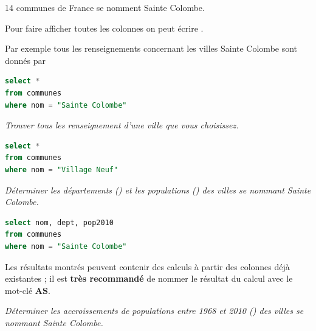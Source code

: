 14 communes de France se nomment Sainte Colombe.

\medskip

Pour faire afficher toutes les colonnes on peut écrire .

Par exemple tous les renseignements concernant les villes Sainte Colombe sont donnés par
\begin{lstlisting}[language=SQL]
select *
from communes  
where nom = "Sainte Colombe"
\end{lstlisting}
\begin{Exercise}
\it Trouver tous les renseignement d'une ville que vous choisissez.
\end{Exercise}
\begin{Answer}
\begin{lstlisting}[language=SQL]
select *
from communes  
where nom = "Village Neuf"
\end{lstlisting}
\end{Answer}
\begin{Exercise}
\it Déterminer les départements () et les populations () des villes se nommant Sainte Colombe.
\end{Exercise}
\begin{Answer}
\begin{lstlisting}[language=SQL]
select nom, dept, pop2010
from communes  
where nom = "Sainte Colombe"
\end{lstlisting}
\end{Answer}
Les résultats montrés peuvent contenir des calculs à partir des colonnes déjà existantes ; il est {\bf très recommandé} de nommer le résultat du calcul avec le mot-clé {\bf AS}.
\begin{Exercise}
\it Déterminer les accroissements de populations entre 1968 et 2010 () des villes se nommant Sainte Colombe.
\end{Exercise}
